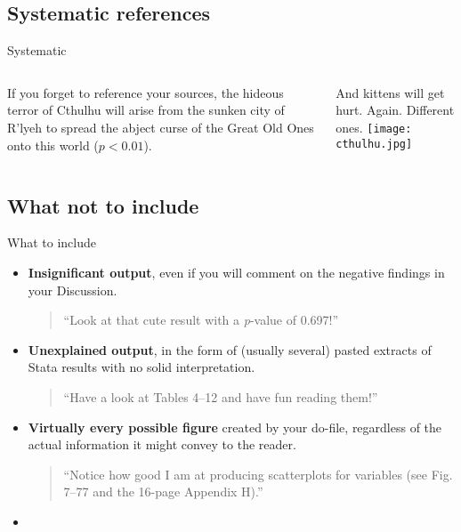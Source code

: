 \documentclass[t]{beamer}
\begin{document}
	\subsection{Systematic references}

	\begin{frame}[t]{Systematic }
		\begin{columns}[T]
			If you forget to reference your sources, the hideous terror of Cthulhu will arise from the sunken city of R'lyeh to spread the abject curse of the Great Old Ones onto this world ($p < 0.01$).\vspace{1em}
		
			And kittens will get hurt. Again. Different ones.
			\texttt{[image: cthulhu.jpg]}
		\end{columns}
	\end{frame}
	
	\subsection{What not to include}
	
	\begin{frame}[t]{What \textbf{} to include}

		\begin{itemize}

			\item \textbf{Insignificant output}, even if you will comment on the negative findings in your Discussion.\\
			\begin{quote}
			``Look at that cute result with a \emph{p}-value of 0.697!''
			\end{quote}

			\item \textbf{Unexplained output}, in the form of (usually several) pasted extracts of Stata results with no solid interpretation.\\
			\begin{quote}
			``Have a look at Tables 4--12 and have fun reading them!''
			\end{quote}

			\item \textbf{Virtually every possible figure} created by your do-file, regardless of the actual information it might convey to the reader.\\
			\begin{quote}
			``Notice how good I am at producing scatterplots for  variables (see Fig. 7--77 and the 16-page Appendix H).''
			\end{quote}

			\item \textbf{}
		\end{itemize}

	\end{frame}
	
\end{document}
